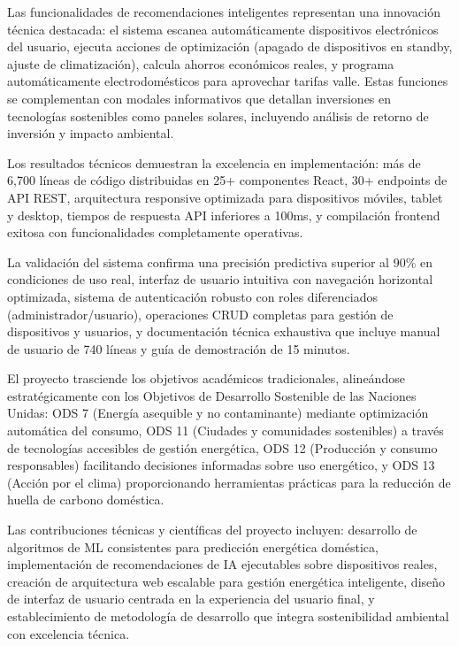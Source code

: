 \documentclass[12pt,a4paper,spanish]{book}
\begin{document}
Las funcionalidades de recomendaciones inteligentes representan una innovación técnica destacada: el sistema escanea automáticamente dispositivos electrónicos del usuario, ejecuta acciones de optimización (apagado de dispositivos en standby, ajuste de climatización), calcula ahorros económicos reales, y programa automáticamente electrodomésticos para aprovechar tarifas valle. Estas funciones se complementan con modales informativos que detallan inversiones en tecnologías sostenibles como paneles solares, incluyendo análisis de retorno de inversión y impacto ambiental.

Los resultados técnicos demuestran la excelencia en implementación: más de 6,700 líneas de código distribuidas en 25+ componentes React, 30+ endpoints de API REST, arquitectura responsive optimizada para dispositivos móviles, tablet y desktop, tiempos de respuesta API inferiores a 100ms, y compilación frontend exitosa con funcionalidades completamente operativas.

La validación del sistema confirma una precisión predictiva superior al 90\% en condiciones de uso real, interfaz de usuario intuitiva con navegación horizontal optimizada, sistema de autenticación robusto con roles diferenciados (administrador/usuario), operaciones CRUD completas para gestión de dispositivos y usuarios, y documentación técnica exhaustiva que incluye manual de usuario de 740 líneas y guía de demostración de 15 minutos.

El proyecto trasciende los objetivos académicos tradicionales, alineándose estratégicamente con los Objetivos de Desarrollo Sostenible de las Naciones Unidas: ODS 7 (Energía asequible y no contaminante) mediante optimización automática del consumo, ODS 11 (Ciudades y comunidades sostenibles) a través de tecnologías accesibles de gestión energética, ODS 12 (Producción y consumo responsables) facilitando decisiones informadas sobre uso energético, y ODS 13 (Acción por el clima) proporcionando herramientas prácticas para la reducción de huella de carbono doméstica.

Las contribuciones técnicas y científicas del proyecto incluyen: desarrollo de algoritmos de ML consistentes para predicción energética doméstica, implementación de recomendaciones de IA ejecutables sobre dispositivos reales, creación de arquitectura web escalable para gestión energética inteligente, diseño de interfaz de usuario centrada en la experiencia del usuario final, y establecimiento de metodología de desarrollo que integra sostenibilidad ambiental con excelencia técnica.
\end{document}
